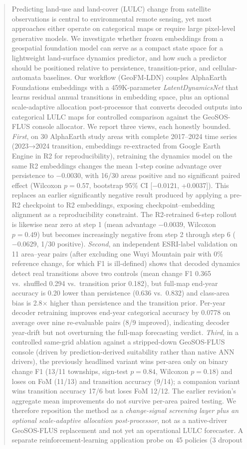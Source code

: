 \documentclass{article}
\begin{document}
\begin{abstract}
Predicting land-use and land-cover (LULC) change from satellite observations is central to environmental remote sensing, yet most approaches either operate on categorical maps or require large pixel-level generative models. We investigate whether frozen embeddings from a geospatial foundation model can serve as a compact state space for a lightweight land-surface dynamics predictor, and how such a predictor should be positioned relative to persistence, transition-prior, and cellular-automata baselines. Our workflow (GeoFM-LDN) couples AlphaEarth Foundations embeddings with a 459K-parameter \textit{LatentDynamicsNet} that learns residual annual transitions in embedding space, plus an optional scale-adaptive allocation post-processor that converts decoded outputs into categorical LULC maps for controlled comparison against the GeoSOS-FLUS console allocator. We report three views, each honestly bounded. \textit{First}, on 30 AlphaEarth study areas with complete 2017--2024 time series (2023→2024 transition, embeddings re-extracted from Google Earth Engine in R2 for reproducibility), retraining the dynamics model on the same R2 embeddings changes the mean 1-step cosine advantage over persistence to $-0.0030$, with 16/30 areas positive and no significant paired effect (Wilcoxon $p=0.57$, bootstrap 95\% CI [$-0.0121$, +0.0037]). This replaces an earlier significantly negative result produced by applying a pre-R2 checkpoint to R2 embeddings, exposing checkpoint--embedding alignment as a reproducibility constraint. The R2-retrained 6-step rollout is likewise near zero at step 1 (mean advantage $-0.0039$, Wilcoxon $p=0.49$) but becomes increasingly negative from step 2 through step 6 ($-0.0629$, 1/30 positive). \textit{Second}, an independent ESRI-label validation on 11 area--year pairs (after excluding one Wuyi Mountain pair with 0\% reference change, for which F1 is ill-defined) shows that decoded dynamics detect real transitions above two controls (mean change F1 0.365 vs.\ shuffled 0.294 vs.\ transition prior 0.182), but full-map end-year accuracy is 0.20 lower than persistence (0.636 vs.\ 0.832) and class-area bias is 2.8$\times$ higher than persistence and the transition prior. Per-year decoder retraining improves end-year categorical accuracy by 0.0778 on average over nine re-evaluable pairs (8/9 improved), indicating decoder year-drift but not overturning the full-map forecasting verdict. \textit{Third}, in a controlled same-grid ablation against a stripped-down GeoSOS-FLUS console (driven by prediction-derived suitability rather than native ANN drivers), the previously headlined variant wins per-area only on binary change F1 (13/11 townships, sign-test $p=0.84$, Wilcoxon $p=0.18$) and loses on FoM (11/13) and transition accuracy (9/14); a companion variant wins transition accuracy 17/6 but loses FoM 12/12. The earlier revision's aggregate mean improvements do not survive per-area paired testing. We therefore reposition the method as a \textit{change-signal screening layer plus an optional scale-adaptive allocation post-processor}, not as a native-driver GeoSOS-FLUS replacement and not yet an operational LULC forecaster. A separate reinforcement-learning application probe on 45 policies (3 dropout 
\end{abstract}
\end{document}
